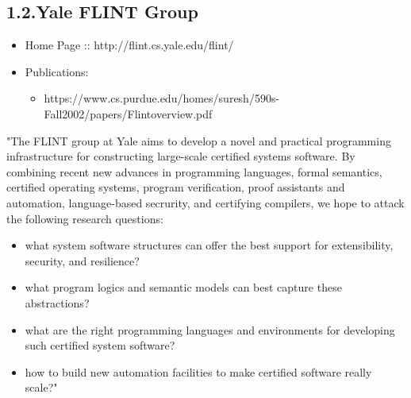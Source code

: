 \documentclass[12pt,twoside]{article}
\begin{document}
\subsection{1.2.\hspace*{0.5em}Yale FLINT Group}\label{sec-yale-flint-group}%

\begin{itemize}[noitemsep,topsep=\mdcompacttopsep]%

\item{}Home Page :: http://flint.cs.yale.edu/flint/%

\item{}Publications:

\begin{itemize}[noitemsep,topsep=\mdcompacttopsep]%

\item{}https://www.cs.purdue.edu/homes/suresh/590s-Fall2002/papers/Flintoverview.pdf%
\end{itemize}%
\end{itemize}%

\noindent{}"The FLINT group at Yale aims to develop a novel and practical
programming infrastructure for constructing large-scale certified
systems software. By combining recent new advances in programming
languages, formal semantics, certified operating systems, program
verification, proof assistants and automation, language-based
secrurity, and certifying compilers, we hope to attack the following
research questions:%

\begin{itemize}[noitemsep,topsep=\mdcompacttopsep]%

\item{}what system software structures can offer the best support for extensibility, security, and resilience?%

\item{}what program logics and semantic models can best capture these abstractions?%

\item{}what are the right programming languages and environments for developing such certified system software?%

\item{}how to build new automation facilities to make certified software really scale?"%
\end{itemize}%
\end{document}
